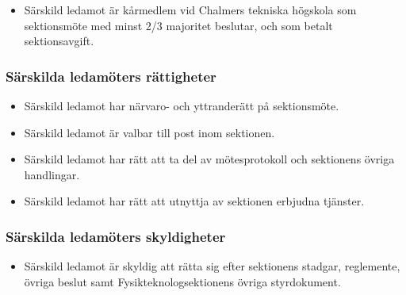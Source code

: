\documentclass[11pt,a4paper]{article}
\begin{document}
\begin{itemize}

  \item Särskild ledamot är kårmedlem vid Chalmers tekniska högskola
  som sektionsmöte med minst 2/3 majoritet beslutar, och som betalt
  sektionsavgift.

\end{itemize}

\subsubsection{Särskilda ledamöters rättigheter}

\begin{itemize}

   \item Särskild ledamot har närvaro- och yttranderätt på
   sektionsmöte.

   \item Särskild ledamot är valbar till post inom sektionen.

   \item Särskild ledamot har rätt att ta del av mötesprotokoll och
   sektionens övriga handlingar.

   \item Särskild ledamot har rätt att utnyttja av sektionen erbjudna
   tjänster.

\end{itemize}

\subsubsection{Särskilda ledamöters skyldigheter}

\begin{itemize}


\item Särskild ledamot är skyldig att rätta sig efter sektionens stadgar,
   regle\-mente, övriga beslut samt Fysikteknologsektionens övriga styrdokument.


\end{itemize}

\newpage

\end{document}
